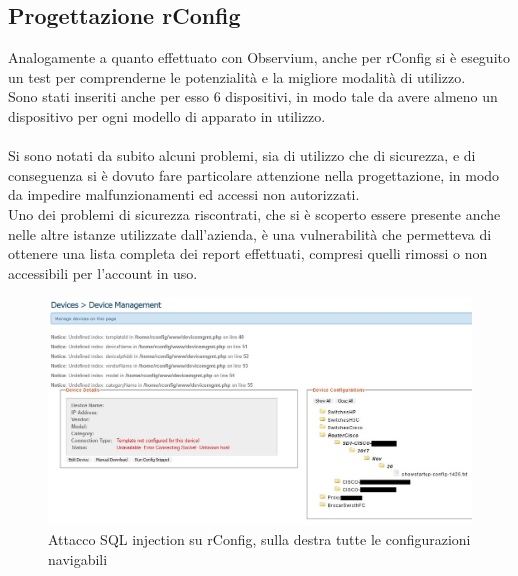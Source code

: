 \documentclass[Realizzazione.tex]{subfiles}
\begin{document}
\subsection{Progettazione rConfig}
Analogamente a quanto effettuato con Observium, anche per rConfig si è eseguito un test per comprenderne le potenzialità e la migliore modalità di utilizzo. \\
Sono stati inseriti anche per esso 6 dispositivi, in modo tale da avere almeno un dispositivo per ogni modello di apparato in utilizzo. \\\\
Si sono notati da subito alcuni problemi, sia di utilizzo che di sicurezza, e di conseguenza si è dovuto fare particolare attenzione nella progettazione, in modo da impedire malfunzionamenti ed accessi non autorizzati. \\
Uno dei problemi di sicurezza riscontrati, che si è scoperto essere presente anche nelle altre istanze utilizzate dall'azienda, è una vulnerabilità  che permetteva di ottenere una lista completa dei report effettuati, compresi quelli rimossi o non accessibili per l'account in uso. \\
\begin{figure}[H]
	\centering
	\includegraphics[width=1\linewidth]{"images/rConfig_SQLi"}
	\caption{Attacco SQL injection su rConfig, sulla destra tutte le configurazioni navigabili}
	\label{fig:Attacco SQL injection su rConfig, sulla destra tutte le configurazioni navigabili}
\end{figure}
\end{document}
